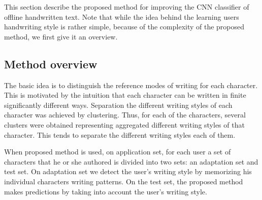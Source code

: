 \documentclass{article}
\begin{document}
This section describe the proposed method for improving the CNN classifier of offline handwritten text. 
Note that while the idea behind the learning users handwriting style is rather simple, because of the complexity of the proposed method, we first give it an overview. 

\subsection{Method overview}

The basic idea is to distinguish the reference modes %
of writing for each character. 
This is motivated by the intuition that each character can be written in finite significantly different ways. 
Separation the different writing styles of each character was achieved by clustering. 
Thus, for each of the characters, several clusters were obtained representing aggregated different writing styles of that character. 
This tends to separate the different writing styles each of them. 

When proposed method is used, on application set, for each user a set of characters that he or she authored is divided into two sets: an adaptation set and test set. 
On adaptation set we detect the user's writing style by memorizing his individual characters writing patterns. 
On the test set, the proposed method makes predictions by taking into account the user's writing style. 
\end{document}
